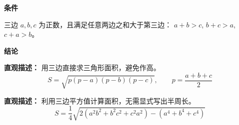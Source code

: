 \begin{statementbox}
	\textbf{\textcolor{CStatement}{条件}}

	\begin{description}[style=nextline, leftmargin=2.8em, labelsep=0.5em, itemsep=0.35em]
		\item[\textbf{\textcolor{CStatement}{条件 1（三角形不等式）}}]
		      三边 $a,b,c$ 为正数，且满足任意两边之和大于第三边：
		      $a+b>c$, $b+c>a$, $c+a>b$。
	\end{description}

	\textbf{\textcolor{CStatement}{结论}}

	\begin{description}[style=nextline, leftmargin=2.8em, labelsep=0.5em, itemsep=0.45em]
		\item[\textbf{\textcolor{CStatement}{结论一（海伦公式）}}]
		      \textbf{\textcolor{CStatement}{直观描述：}}
		      用三边直接求三角形面积，避免作高。
		      \[
			      S = \sqrt{p(p-a)(p-b)(p-c)},
			      \qquad
			      p = \frac{a+b+c}{2}
		      \]

		\item[\textbf{\textcolor{CStatement}{常见变形（四次式形式）}}]
		      \textbf{\textcolor{CStatement}{直观描述：}}
		      利用三边平方值计算面积，无需显式写出半周长。
		      \[
			      S = \frac{1}{4}\sqrt{2(a^2b^2+b^2c^2+c^2a^2)-(a^4+b^4+c^4)}
		      \]
	\end{description}
\end{statementbox}